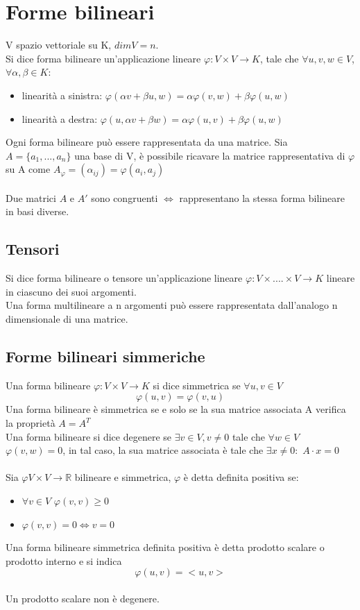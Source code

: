 \documentclass{article}
\newcommand{\R}{\mathds{R}}
\begin{document}
\section{Forme bilineari}
V spazio vettoriale su K, $dimV=n$.\\
Si dice forma bilineare un'applicazione lineare $\varphi:V\times V\rightarrow K$, tale che $\forall u,v,w\in V$, $\forall \alpha, \beta\in K$:
\begin{itemize}
    \item linearità a sinistra: $\varphi(\alpha v+\beta u, w)=\alpha\varphi(v,w)+\beta\varphi(u,w)$
    \item linearità a destra: $\varphi(u, \alpha v+\beta w)=\alpha\varphi(u,v)+\beta\varphi(u,w)$
\end{itemize}
Ogni forma bilineare può essere rappresentata da una matrice. Sia $A=\{a_1,...,a_n\}$ una base di V, è possibile ricavare la matrice rappresentativa di $\varphi$ su A come $ A_\varphi=(\alpha_{ij})=\varphi(a_i,a_j)$\\\\
Due matrici $A$ e $A'$ sono congruenti $\Leftrightarrow$ rappresentano la stessa forma bilineare in basi diverse.

\subsection{Tensori}
Si dice forma bilineare o tensore un'applicazione lineare $\varphi:V\times .... \times V\rightarrow K$ lineare in ciascuno dei suoi argomenti.\\
Una forma multilineare a n argomenti può essere rappresentata dall'analogo n dimensionale di una matrice.

\subsection{Forme bilineari simmeriche}
Una forma bilineare $\varphi:V\times V\rightarrow K$ si dice simmetrica se
$\forall u,v\in V$ $$\varphi(u,v)=\varphi(v,u)$$
Una forma bilineare è simmetrica se e solo se la sua matrice associata A verifica la proprietà $A=A^T$\\
Una forma bilineare si dice degenere se $\exists v\in V, v\neq0$ tale che $\forall w\in V$ $\varphi(v,w)=0$, in tal caso, la sua matrice associata è tale che $\exists x\neq0:$ $A\cdot x=0$\\\\
Sia $\varphi V\times V\rightarrow \R$ bilineare e simmetrica, $\varphi$ è detta definita positiva se:
\begin{itemize}
    \item $\forall v\in V$ $\varphi(v,v)\geq0$
    \item $\varphi(v,v)=0\Leftrightarrow v=0$
\end{itemize}
Una forma bilineare simmetrica definita positiva è detta prodotto scalare o prodotto interno e si indica $$\varphi(u,v)=<u,v>$$\\
Un prodotto scalare non è degenere.
\end{document}
